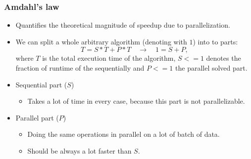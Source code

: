 \begin{frame}
\frametitle{Amdahl's law}

\begin{itemize}
	\item<1-> Quantifies the theoretical magnitude of speedup due to parallelization.
	\item<2-> We can split a whole arbitrary algorithm (denoting with $1$) into to parts:
	\begin{equation} \label{eq:1}
		T = S*T + P*T
		\quad \to \quad
		1 = S + P,
	\end{equation}
	where $T$ is the total execution time of the algorithm, $S <= 1$ denotes the fraction of runtime of the sequentially and $P <= 1$ the parallel solved part.
	\item<3-> Sequential part ($S$)
	\begin{itemize}
		\item<3-> Takes a lot of time in every case, because this part is not parallelizable.
	\end{itemize}
	\item<4-> Parallel part ($P$)
	\begin{itemize}
		\item<4-> Doing the same operations in parallel on a lot of batch of data.
		\item<4-> Should be always a lot faster than $S$.
	\end{itemize}
\end{itemize}

\end{frame}